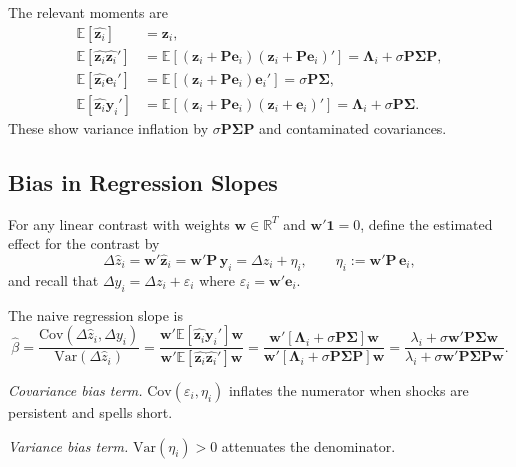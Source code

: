 \documentclass[11pt,a4paper]{article}
\newcommand{\Var}{\text{Var}}
\newcommand{\Cov}{\text{Cov}}
\begin{document}
The relevant moments are
\begin{align}
  \mathbb E[\hat{\mathbf z_i}] &= \mathbf z_i,\\
  \mathbb E[\hat{\mathbf z_i}\hat{\mathbf z_i}'] &= 
\mathbb E[(\mathbf z_i + \mathbf P\mathbf e_i)(\mathbf z_i + \mathbf P\mathbf e_i)' ] =
    \mathbf \Lambda_i + \sigma\mathbf P\mathbf\Sigma\mathbf P,\\ 
  \mathbb E[\hat{\mathbf z_i}\mathbf e_i'] &= 
\mathbb E[(\mathbf z_i + \mathbf P\mathbf e_i)\mathbf e_i' ] = \sigma\mathbf P\mathbf\Sigma,\\
  \mathbb E[\hat{\mathbf z_i}\mathbf y_i'] &= 
\mathbb E[(\mathbf z_i + \mathbf P\mathbf e_i)(\mathbf z_i + \mathbf e_i)' ] = \mathbf \Lambda_i + \sigma\mathbf P\mathbf\Sigma.
\end{align}
These show variance inflation by $\sigma\mathbf P\mathbf\Sigma\mathbf P$ and contaminated covariances.

\subsection{Bias in Regression Slopes}

For any linear contrast with weights $\mathbf w\in\mathbb R^T$ and $\mathbf w'\mathbf 1=0$, define the estimated effect for the contrast by
$$
\Delta\hat z_i = \mathbf w'\hat{\mathbf z}_i = \mathbf w'\mathbf P\,\mathbf y_i = \Delta z_i + \eta_i,\qquad \eta_i:=\mathbf w'\mathbf P\,\mathbf e_i,
$$
and recall that $\Delta y_i = \Delta z_i + \varepsilon_i$ where $\varepsilon_i=\mathbf w'\mathbf e_i$. 

The naive regression slope is
\begin{equation}
\hat\beta = 
  \frac {\Cov(\Delta \hat z_i, \Delta y_i)}
        {\Var(\Delta \hat z_i)} =
  \frac {\mathbf w' \mathbb E[\hat{\mathbf z_i}\mathbf y_i ']\mathbf w}
        {\mathbf w' \mathbb E[\hat{\mathbf z_i}\hat{\mathbf z_i}']\mathbf w} =
  \frac {\mathbf w' [\mathbf \Lambda_i + \sigma \mathbf P\mathbf\Sigma]\mathbf w}
        {\mathbf w' [\mathbf \Lambda_i + \sigma \mathbf P\mathbf\Sigma\mathbf P]\mathbf w} =
  \frac {\lambda_i + \sigma \mathbf w' \mathbf P\mathbf\Sigma \mathbf w}
        {\lambda_i + \sigma \mathbf w' \mathbf P\mathbf\Sigma \mathbf P \mathbf w}. 
\end{equation}  

\textit{Covariance bias term.} $\Cov(\varepsilon_i,\eta_i)$ inflates the numerator when shocks are persistent and spells short.

\textit{Variance bias term.} $\Var(\eta_i)>0$ attenuates the denominator.
\end{document}

